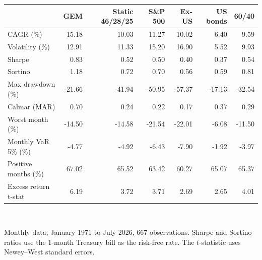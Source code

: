 \footnotesize
\begin{tabular}{lrrrrrr}
\toprule
  & \textbf{GEM} & \textbf{Static 46/28/25} & \textbf{S\&P 500} & \textbf{Ex-US} & \textbf{US bonds} & \textbf{60/40} \\
\midrule
CAGR (\%) & 15.18 & 10.03 & 11.27 & 10.02 & 6.40 & 9.59 \\
Volatility (\%) & 12.91 & 11.33 & 15.20 & 16.90 & 5.52 & 9.93 \\
Sharpe & 0.83 & 0.52 & 0.50 & 0.40 & 0.37 & 0.54 \\
Sortino & 1.18 & 0.72 & 0.70 & 0.56 & 0.59 & 0.81 \\
Max drawdown (\%) & -21.66 & -41.94 & -50.95 & -57.37 & -17.13 & -32.54 \\
Calmar (MAR) & 0.70 & 0.24 & 0.22 & 0.17 & 0.37 & 0.29 \\
Worst month (\%) & -14.50 & -14.58 & -21.54 & -22.01 & -6.08 & -11.50 \\
Monthly VaR 5\% (\%) & -4.77 & -4.92 & -6.43 & -7.90 & -1.92 & -3.97 \\
Positive months (\%) & 67.02 & 65.52 & 63.42 & 60.27 & 65.07 & 65.37 \\
Excess return t-stat & 6.19 & 3.72 & 3.71 & 2.69 & 2.65 & 4.01 \\
\bottomrule
\end{tabular}
\\[0.4em]
\begin{minipage}{\linewidth}\footnotesize Monthly data, January 1971 to July 2026, 667 observations. Sharpe and Sortino ratios use the 1-month Treasury bill as the risk-free rate. The $t$-statistic uses Newey--West standard errors.\end{minipage}
